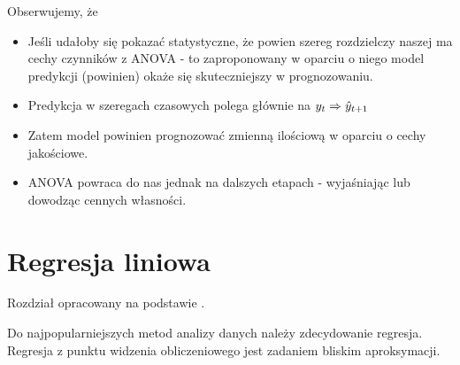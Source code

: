 \documentclass[10pt,a4paper]{book}
\begin{document}
Obserwujemy, że
\begin{itemize}
\item Jeśli udałoby się pokazać statystyczne, że powien szereg rozdzielczy naszej ma cechy czynników z ANOVA - to zaproponowany w oparciu o niego model predykcji (powinien) okaże się skuteczniejszy w prognozowaniu.
\item Predykcja w szeregach czasowych polega głównie na $y_t \Rightarrow \predict{y}{t+1}$
\item Zatem model powinien prognozować zmienną ilościową w oparciu o cechy jakościowe.
\item ANOVA powraca do nas jednak na dalszych etapach - wyjaśniając lub dowodząc cennych własności.
\end{itemize}

\section{Regresja liniowa}

Rozdział opracowany na podstawie \cite{montgomery2015introduction}.

Do najpopularniejszych metod analizy danych należy zdecydowanie regresja. Regresja z punktu widzenia obliczeniowego jest zadaniem bliskim aproksymacji.
\end{document}
